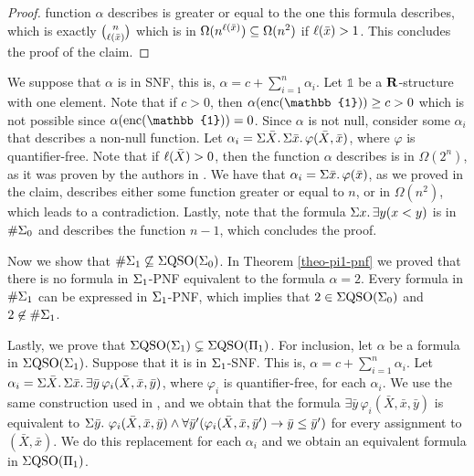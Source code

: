 \begin{proof}
function $\alpha$ describes is greater or equal to the one this formula describes, which is exactly $\binom{n}{\ell(\bar{x})}$ which is in $\Omega(n^{\ell(\bar{x})}) \subseteq \Omega(n^2)$ if $\ell(\bar{x}) > 1$. This concludes the proof of the claim.
\end{proof}
We suppose that $\alpha$ is in SNF, this is, $\alpha = c + \sum_{i = 1}^n\alpha_i$. Let $\mathbb{1}$ be a $\mathbf{R}$-structure with one element. Note that if $c > 0$, then $\alpha(\enc(\mathbb{1})) \geq c > 0$ which is not possible since $\alpha(\enc(\mathbb{1})) = 0$. Since $\alpha$ is not null, consider some $\alpha_i$ that describes a non-null function. Let $\alpha_i = \Sigma{\bar{X}}.\,\Sigma{\bar{x}}.\,\varphi(\bar{X},\bar{x})$, where $\varphi$ is quantifier-free. Note that if $\ell(\bar{X}) > 0$, then the function $\alpha$ describes is in $\Omega(2^n)$, as it was proven by the authors in \cite{SalujaST95}. We have that $\alpha_i = \Sigma{\bar{x}}.\,\varphi(\bar{x})$, as we proved in the claim, describes either some function greater or equal to $n$, or in $\Omega(n^2)$, which leads to a contradiction. Lastly, note that the formula $\Sigma{x}.\,\exists y(x < y)$ is in $\#\Sigma_{0}$ and describes the function $n-1$, which concludes the proof.

\vspace{1em}
Now we show that $\#\Sigma_{1}\not\subseteq\Sigma{\rm QSO}(\Sigma_{0})$. In Theorem \ref{theo-pi1-pnf} we proved that there is no formula in $\Sigma_{1}$-PNF equivalent to the formula $\alpha = 2$. Every formula in $\#\Sigma_{1}$ can be expressed in $\Sigma_{1}$-PNF, which implies that $2 \in \Sigma{\rm QSO}(\Sigma_{0})$ and $2 \not\in \#\Sigma_{1}$.

\vspace{1em}
Lastly, we prove that $\Sigma{\rm QSO}(\Sigma_{1})\subsetneq\Sigma{\rm QSO}(\Pi_{1})$. For inclusion, let $\alpha$ be a formula in $\Sigma{\rm QSO}(\Sigma_{1})$. Suppose that it is in $\Sigma_{1}$-SNF. This is, $\alpha = c + \sum_{i = 1}^{n}\alpha_i$. Let $\alpha_i = \Sigma{\bar{X}}.\,\Sigma{\bar{x}}.\,\exists\bar{y}\,\varphi_i(\bar{X},\bar{x},\bar{y})$, where $\varphi_i$ is quantifier-free, for each $\alpha_i$. We use the same construction used in \cite{SalujaST95}, and we obtain that the formula $\exists\bar{y}\,\varphi_i(\bar{X},\bar{x},\bar{y})$ is equivalent to $\Sigma{\bar{y}}.\,\,\varphi_i(\bar{X},\bar{x},\bar{y}) \wedge \forall\bar{y}'(\varphi_i(\bar{X},\bar{x},\bar{y}')\to\bar{y}\leq\bar{y}')$ for every assignment to $(\bar{X},\bar{x})$. We do this replacement for each $\alpha_i$ and we obtain an equivalent formula in $\Sigma{\rm QSO}(\Pi_{1})$.

